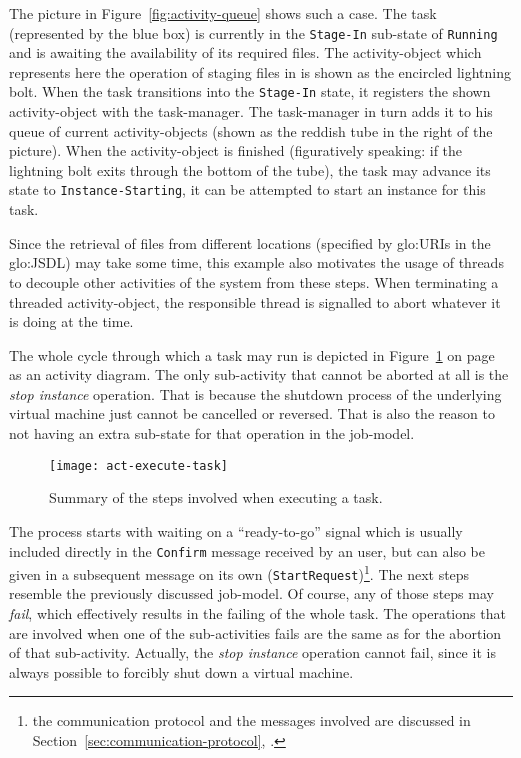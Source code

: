 The picture in Figure~\ref{fig:activity-queue} shows such a case. The task
(represented  by  the blue  box)  is  currently  in the  \texttt{Stage-In}
sub-state  of \texttt{Running}  and is  awaiting the  availability  of its
required files.   The activity-object which represents  here the operation
of staging  files in is shown  as the encircled lightning  bolt.  When the
task transitions into the  \texttt{Stage-In} state, it registers the shown
activity-object with the task-manager. The task-manager in turn adds it to
his queue  of current activity-objects (shown  as the reddish  tube in the
right of the picture).  When the activity-object is finished (figuratively
speaking: if the lightning bolt exits through the bottom of the tube), the
task may  advance its state  to \texttt{Instance-Starting}, \ie it  can be
attempted to start an instance for this task.

Since  the  retrieval of  files  from  different  locations (specified  by
\gls{glo:URI}s  in the \gls{glo:JSDL})  may take  some time,  this example
also motivates  the usage of threads  to decouple other  activities of the
system from these steps.  When terminating a threaded activity-object, the
responsible thread is signalled to abort whatever it is doing at the time.

The  whole   cycle  through   which  a  task   may  run  is   depicted  in
Figure~\ref{fig:act-execute-task}  on  page~\pageref{fig:act-execute-task}
as an activity  diagram.  The only sub-activity that  cannot be aborted at
all is  the \emph{stop instance}  operation. That is because  the shutdown
process  of the  underlying virtual  machine just  cannot be  cancelled or
reversed. That  is also the  reason to not  having an extra  sub-state for
that operation in the job-model.

\begin{figure}[ht]
  \centering
  \texttt{[image: act-execute-task]}
  \caption[Summary of executing a task]{Summary of the steps involved when executing a task.}
  \label{fig:act-execute-task}
\end{figure}

The  process starts  with waiting  on  a ``ready-to-go''  signal which  is
usually included  directly in the \texttt{Confirm} message  received by an
user,  but  can  also  be  given  in  a  subsequent  message  on  its  own
(\texttt{Start\-Request})\footnote{the  communication   protocol  and  the
  messages           involved          are           discussed          in
  Section~\ref{sec:communication-protocol},
  \emph{}.}.  The  next steps resemble
the  previously discussed  job-model. Of  course, any  of those  steps may
\emph{fail}, which effectively  results in the failing of  the whole task.
The operations that are involved  when one of the sub-activities fails are
the  same  as  for  the  abortion of  that  sub-activity.   Actually,  the
\emph{stop instance} operation cannot fail, since it is always possible to
forcibly shut down a virtual machine.

